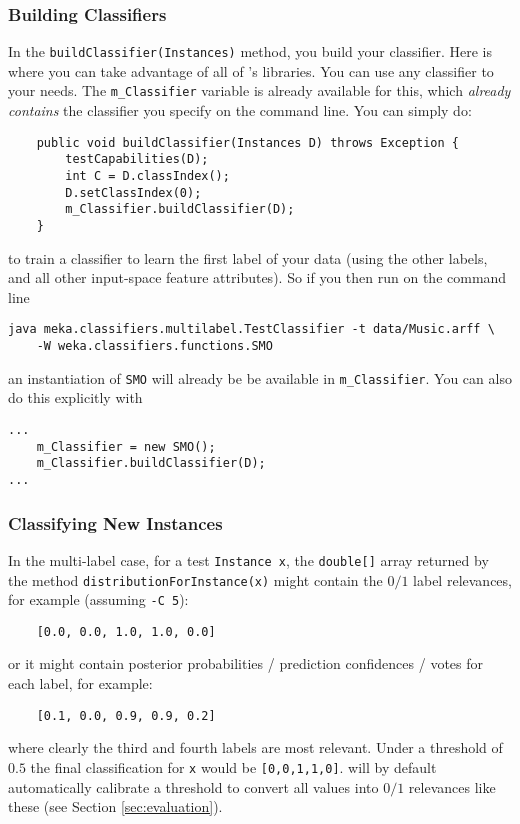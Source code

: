 \documentclass[11pt]{article}
\newcommand{\MEKA}{Meka}
\newcommand{\WEKA}{Weka}
\begin{document}
\subsubsection{Building Classifiers}

In the \texttt{buildClassifier(Instances)} method, you build your classifier. Here is where you can take advantage of all of \framework{\WEKA}'s libraries. You can use any \framework{\WEKA} classifier to your needs. The \texttt{m\_Classifier} variable is already available for this, which \textit{already contains} the \framework{\WEKA} classifier you specify on the command line. You can simply do:
{
\lstset{basicstyle=\small\ttfamily,breaklines=true,language=java,frame=L,xleftmargin=\parindent}
\begin{lstlisting}
    public void buildClassifier(Instances D) throws Exception {
        testCapabilities(D);
        int C = D.classIndex();
        D.setClassIndex(0);
        m_Classifier.buildClassifier(D);
    }
\end{lstlisting}
}
to train a classifier to learn the first label of your data (using the other labels, and all other input-space feature attributes). So if you then run on the command line
{
\lstset{basicstyle=\small\ttfamily,breaklines=true,language=java,frame=L,xleftmargin=\parindent}
\begin{lstlisting}
java meka.classifiers.multilabel.TestClassifier -t data/Music.arff \
	-W weka.classifiers.functions.SMO
\end{lstlisting}
}
an instantiation of \texttt{SMO} will already be be available in \texttt{m\_Classifier}. You can also do this explicitly with
{
\lstset{basicstyle=\small\ttfamily,breaklines=true,language=java,frame=L,xleftmargin=\parindent}
\begin{lstlisting}
...
    m_Classifier = new SMO();
    m_Classifier.buildClassifier(D);
...
\end{lstlisting}
}

\subsubsection{Classifying New Instances}

In the multi-label case, for a test \texttt{Instance x}, the \texttt{double[]} array returned by the method \texttt{distributionForInstance(x)} might contain the $0/1$ label relevances, for example (assuming \texttt{-C 5}):
\begin{lstlisting}
	[0.0, 0.0, 1.0, 1.0, 0.0]
\end{lstlisting} 
or it might contain posterior probabilities / prediction confidences / votes for each label, for example:
\begin{lstlisting}
	[0.1, 0.0, 0.9, 0.9, 0.2]
\end{lstlisting} 
where clearly the third and fourth labels are most relevant. Under a threshold of $0.5$ the final classification for \texttt{x} would be \texttt{[0,0,1,1,0]}. \framework{\MEKA} will by default automatically calibrate a threshold to convert all values into $0/1$ relevances like these (see Section \ref{sec:evaluation}). 
\end{document}
